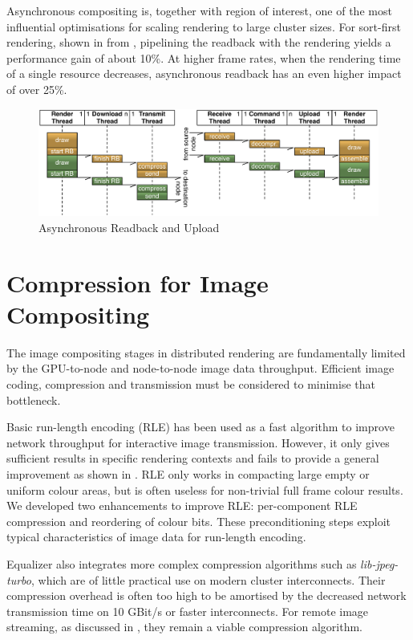 Asynchronous compositing is, together with region of interest, one of the most
influential optimisations for scaling rendering to large cluster sizes. For
sort-first rendering, shown in  from \cite{EBAHMP:12}, pipelining
the readback with the rendering yields a performance gain of about 10\%. At
higher frame rates, when the rendering time of a single resource decreases,
asynchronous readback has an even higher impact of over 25\%.

\begin{figure}[t]\center
  \includegraphics[scale=0.6]{images/asyncReadback}
  \caption{Asynchronous Readback and Upload\label{fAsyncRB}}
\end{figure}


\section{Compression for Image Compositing}

The image compositing stages in distributed rendering are fundamentally limited
by the GPU-to-node and node-to-node image data throughput. Efficient
image coding, compression and transmission must be considered to minimise that
bottleneck.

Basic run-length encoding (RLE) has been used as a fast algorithm to improve
network throughput for interactive image transmission. However, it only gives
sufficient results in specific rendering contexts and fails to provide a
general improvement as shown in \cite{MEP:10}. RLE only works in compacting large
empty or uniform colour areas, but is often useless for non-trivial full frame
colour results. We developed two enhancements to improve RLE: per-component RLE
compression and reordering of colour bits. These preconditioning steps exploit
typical characteristics of image data for run-length encoding.

Equalizer also integrates more complex compression algorithms such as {\em
lib-jpeg-turbo}, which are of little practical use on modern cluster
interconnects. Their compression overhead is often too high to be amortised by
the decreased network transmission time on 10 GBit/s or faster interconnects.
For remote image streaming, as discussed in , they remain a
viable compression algorithm.

